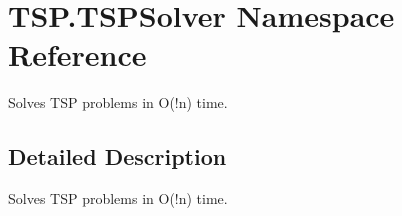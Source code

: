 \hypertarget{namespaceTSP_1_1TSPSolver}{}\section{T\+S\+P.\+T\+S\+P\+Solver Namespace Reference}
\label{namespaceTSP_1_1TSPSolver}


Solves T\+SP problems in O(!n) time.  




\subsection{Detailed Description}
Solves T\+SP problems in O(!n) time. 

